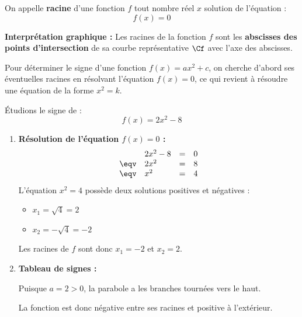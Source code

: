 \begin{defn}
	On appelle \textbf{racine} d'une fonction $f$ tout nombre réel $x$ solution de l'équation :
	\[
		f(x) = 0
	\]

	\textbf{Interprétation graphique :} Les racines de la fonction $f$ sont les \textbf{abscisses des points d'intersection} de sa courbe représentative $\Cf$ avec l'axe des abscisses.
\end{defn}

\begin{methode}[Résolution de l'équation $f(x) = 0$ et étude du signe]
	Pour déterminer le signe d'une fonction $f(x) = ax^2 + c$, on cherche d'abord ses éventuelles racines en résolvant l'équation $f(x) = 0$, ce qui revient à résoudre une équation de la forme $x^2 = k$.

	Étudions le signe de :
	\[
		f(x) = 2x^2 - 8
	\]

	\begin{enumerate}
		\item \textbf{Résolution de l'équation $f(x) = 0$ :}
		      \[
			      \begin{array}{rlcl}
				           & 2x^2 - 8 & = & 0 \\
				      \eqv & 2x^2     & = & 8 \\
				      \eqv & x^2      & = & 4
			      \end{array}
		      \]
		      L'équation $x^2 = 4$ possède deux solutions positives et négatives :

		      \begin{itemize}
			      \item $x_1 = \sqrt{4} = 2$
			      \item $x_2 = -\sqrt{4} = -2$
		      \end{itemize}

		      Les racines de $f$ sont donc $x_1 = -2$ et $x_2 = 2$.

		\item \textbf{Tableau de signes :}

		      Puisque $a = 2 > 0$, la parabole a les branches tournées vers le haut.

		      La fonction est donc négative entre ses racines et positive à l'extérieur.

		      \begin{center}
		      \end{center}


\end{enumerate}
\end{methode}
